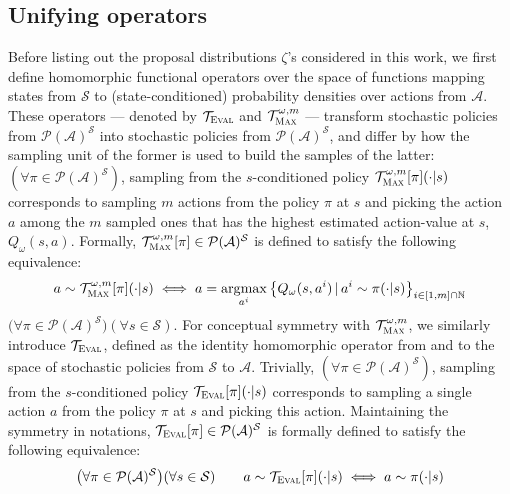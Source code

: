 \subsection{Unifying operators}
\label{operators}
Before listing out the proposal distributions $\zeta$'s considered in this work,
we first define homomorphic functional operators over the space of
functions mapping states from $\mathcal{S}$
to (state-conditioned) probability densities over actions from $\mathcal{A}$.
These operators --- denoted by $\mathcal{T}_\textsc{Eval}$ and
$\mathcal{T}_\textsc{Max}^{\omega, m}$ --- transform
stochastic policies from $\mathcal{P}(\mathcal{A})^\mathcal{S}$
into stochastic policies from $\mathcal{P}(\mathcal{A})^\mathcal{S}$,
and differ by how the sampling unit of the former is used to build the samples of the latter:
$(\forall \pi \in \mathcal{P}(\mathcal{A})^\mathcal{S})$,
sampling from the $s$-conditioned policy $\mathcal{T}_\textsc{Max}^{\omega, m}[\pi](\cdot | s)$
corresponds to sampling $m$ actions from the policy $\pi$ at $s$ and picking the action $a$ among the $m$ sampled ones
that has the highest estimated action-value at $s$, $Q_\omega(s,a)$.
Formally, $\mathcal{T}_\textsc{Max}^{\omega, m}[\pi] \in \mathcal{P}(\mathcal{A})^\mathcal{S}$
is defined to satisfy the following equivalence:
\begin{align}
  a \sim \mathcal{T}_\textsc{Max}^{\omega, m}[\pi](\cdot | s)
  \iff
  a = \operatorname*{\arg\!\max}_{a^i} \big\{ Q_\omega(s, a^i) \, | \, a^i \sim \pi(\cdot | s)\big\}_{i \in [1,m] \cap \mathbb{N}}
  \label{tmaxop}
\end{align}
$\big(\forall \pi \in \mathcal{P}(\mathcal{A})^\mathcal{S}\big)
(\forall s \in \mathcal{S})$.
For conceptual symmetry with $\mathcal{T}_\textsc{Max}^{\omega, m}$, we similarly introduce
$\mathcal{T}_\textsc{Eval}$, defined as the identity
homomorphic operator from and to the space of stochastic policies from $\mathcal{S}$ to $\mathcal{A}$.
Trivially, $(\forall \pi \in \mathcal{P}(\mathcal{A})^\mathcal{S})$,
sampling from the $s$-conditioned policy $\mathcal{T}_\textsc{Eval}[\pi](\cdot | s)$
corresponds to sampling a single action $a$ from the policy $\pi$ at $s$ and picking this action.
Maintaining the symmetry in notations, $\mathcal{T}_\textsc{Eval}[\pi] \in \mathcal{P}(\mathcal{A})^\mathcal{S}$
is formally defined to satisfy the following equivalence:
\begin{align}
  \big(\forall \pi \in \mathcal{P}(\mathcal{A})^\mathcal{S}\big)
  (\forall s \in \mathcal{S})
  \qquad
  a \sim \mathcal{T}_\textsc{Eval}[\pi](\cdot | s)
  \iff
  a \sim \pi(\cdot | s)
\end{align}

